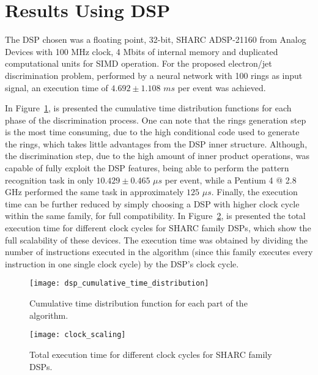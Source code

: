\section{Results Using DSP}

The DSP chosen was a floating point, 32-bit, SHARC ADSP-21160 from Analog
Devices with 100 MHz clock, 4 Mbits of internal memory and duplicated
computational units for SIMD \cite{ADSP_21160_MANUAL} operation. For the
proposed electron/jet discrimination problem, performed by a neural network
with 100 rings as input signal, an execution time of $4.692 \pm 1.108$ $ms$
per event was achieved.

In Figure~\ref{FIG:DSP_CUMULATIVE_TIME}, is presented the cumulative time
distribution functions for each phase of the discrimination process. One can
note that the rings generation step is the most time consuming, due to the
high conditional code used to generate the rings, which takes little
advantages from the DSP inner structure. Although, the discrimination step,
due to the high amount of inner product operations, was capable of fully
exploit the DSP features, being able to perform the pattern recognition task
in only $10.429 \pm 0.465$ $\mu s$ per event, while a Pentium 4 @ 2.8 GHz
performed the same task in approximately $125$ $\mu s$. Finally, the execution
time can be further reduced by simply choosing a DSP with higher clock cycle
within the same family, for full compatibility. In
Figure~\ref{FIG:DSP_CLOCK_TIME}, is presented the total execution time for
different clock cycles for SHARC family DSPs, which show the full scalability
of these devices. The execution time was obtained by dividing the number of
instructions executed in the algorithm (since this family executes every
instruction in one single clock cycle) by the DSP's clock cycle.

\begin{figure}
\begin{center}
\texttt{[image: dsp\_cumulative\_time\_distribution]}
\caption{Cumulative time distribution function for each part of the algorithm.}
\label{FIG:DSP_CUMULATIVE_TIME}
\end{center}
\end{figure}

\begin{figure}
\begin{center}
\texttt{[image: clock\_scaling]}
\caption{Total execution time for different clock cycles for SHARC family DSPs.}
\label{FIG:DSP_CLOCK_TIME}
\end{center}
\end{figure}

